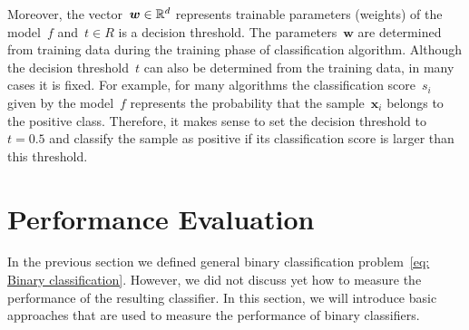 Moreover, the vector~$\bm{w} \in \mathbb{R}^d$ represents trainable parameters (weights) of the model~$f$ and~$t \in R$ is a decision threshold. The parameters~$\bm{w}$ are determined from training data during the training phase of classification algorithm. Although the decision threshold~$t$ can also be determined from the training data, in many cases it is fixed. For example, for many algorithms the classification score~$s_i$ given by the model~$f$ represents the probability that the sample~$\bm{x}_i$ belongs to the positive class. Therefore, it makes sense to set the decision threshold to~$t = 0.5$ and classify the sample as positive if its classification score is larger than this threshold. 

\section{Performance Evaluation}

In the previous section we defined general binary classification problem~\ref{eq: Binary classification}. However, we did not discuss yet how to measure the performance of the resulting classifier. In this section, we will introduce basic approaches that are used to measure the performance of binary classifiers.

